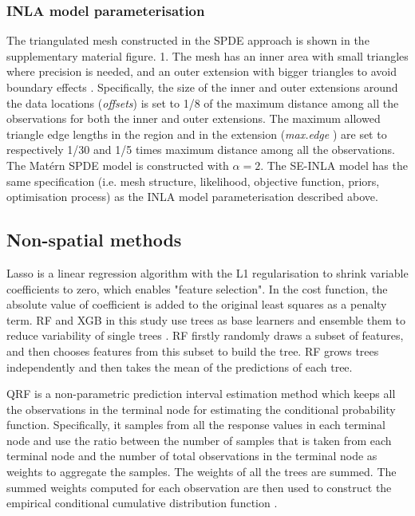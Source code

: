 \documentclass{article}
\begin{document}
\subsubsection{INLA model parameterisation}
The triangulated mesh constructed in the SPDE approach is shown in the supplementary  material figure. 1.
The mesh has an inner area with small triangles where precision is needed, and an outer extension with bigger triangles to avoid boundary effects \citep{moragaetal21}.
Specifically, the size of the inner and outer extensions around the data locations (\textit{offsets}) is set to 1/8 of the maximum distance among all the observations for both the inner and outer extensions. The maximum allowed triangle edge lengths in the region and in the extension (\textit{max.edge }) are set to respectively 1/30 and 1/5 times maximum distance among all the observations. The Mat\'ern SPDE model is constructed with $\alpha =2$. %
The SE-INLA model has the same specification (i.e. mesh structure, likelihood, objective function, priors, optimisation process) as the INLA model parameterisation described above.




\noindent\subsection{Non-spatial methods}
Lasso is a linear regression algorithm with the L1 regularisation to shrink variable coefficients to zero, which enables "feature selection". In the cost function, the absolute value of coefficient is added to the original least squares as a penalty term. RF and XGB in this study use trees as base learners and ensemble them to reduce variability of single trees \citep{friedman2001greedy}. RF firstly randomly draws a subset of features, and then chooses features from this subset to build the tree. RF \citep{breiman2001random} grows trees independently and then takes the mean of the predictions of each tree. 

QRF is a non-parametric prediction interval estimation method which keeps all the observations in the terminal node for estimating the conditional probability function. Specifically, it samples from all the response values in each terminal node and use the ratio between the number of samples that is taken from each terminal node and the number of total observations in the terminal node as weights to aggregate the samples. The weights of all the trees are summed. The summed weights computed for each observation are then used to construct the empirical conditional cumulative distribution function \citep{meinshausen2006quantile}. 
\end{document}
